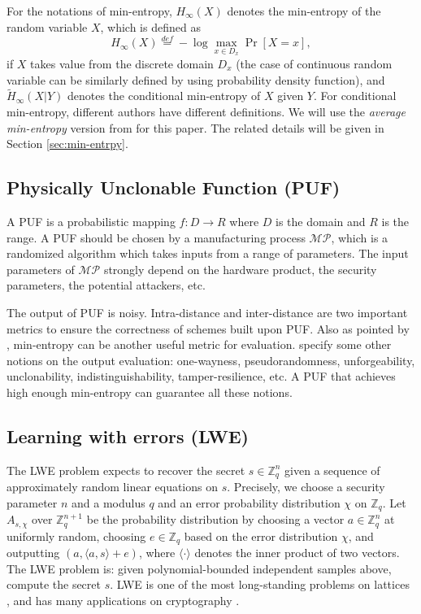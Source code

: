 \documentclass[12pt]{article}
\newcommand{\eqdef}{\stackrel{def}{=}}
\newcommand{\Z}{\mathbb{Z}}
\newcommand{\angles}[1]{\langle #1 \rangle}
\newcommand{\MP}{\mathcal{MP}}
\theoremstyle{definition}
\begin{document}
For the notations of min-entropy, $H_{\infty}(X)$ denotes the min-entropy of the random variable $X$, which is defined as
$$H_{\infty}(X) \eqdef - \log \max_{x\in D_x} \Pr[X=x],$$
if $X$ takes value from the discrete domain $D_x$ (the case of continuous random variable can be similarly defined by using probability density function),
and $\tilde{H}_{\infty}(X|Y)$ denotes the conditional min-entropy of $X$ given $Y$. For conditional min-entropy, different authors have different definitions. We will use the \emph{average min-entropy} version from \cite{dodis2004fuzzy} for this paper. The related details will be given in Section \ref{sec:min-entrpy}. 

\subsection{Physically Unclonable Function (PUF)}
A PUF is a probabilistic mapping $f : D \to R$ where $D$ is the domain and $R$ is the range. A PUF should be chosen by a manufacturing process $\MP$, which is a randomized algorithm which takes inputs from a range of parameters. The input parameters of $\MP$ strongly depend on the hardware product, the security parameters, the potential attackers, etc.

The output of PUF is noisy. Intra-distance and inter-distance are two important metrics to ensure the correctness of schemes built upon PUF. Also as pointed by \cite{sadeghi2016towards}, min-entropy can be another useful metric for evaluation. \cite{sadeghi2016towards} specify some other notions on the output evaluation: one-wayness, pseudorandomness, unforgeability, unclonability, indistinguishability, tamper-resilience, etc. A PUF that achieves high enough min-entropy can guarantee all these notions.

\subsection{Learning with errors (LWE)}
The LWE problem expects to recover the secret $s \in \Z_q^n$ given a sequence of approximately random linear equations on $s$. Precisely, we choose a security parameter $n$ and a modulus $q$ and an error probability distribution $\chi$ on $\Z_q$. Let $A_{s,\chi}$ over $\Z_q^{n+1}$ be the probability distribution by choosing a vector $a\in\Z_q^n$ at uniformly random, choosing $e\in\Z_q$ based on the error distribution $\chi$, and outputting $(a, \angles{a,s}+e)$, where $\angles{\cdot}$ denotes the inner product of two vectors. The LWE problem is: given polynomial-bounded independent samples above, compute the secret $s$. LWE is one of the most long-standing problems on lattices \cite{regev2009lattices,regev2010learning}, and has many applications on cryptography \cite{regev2006lattice}.
\end{document}
